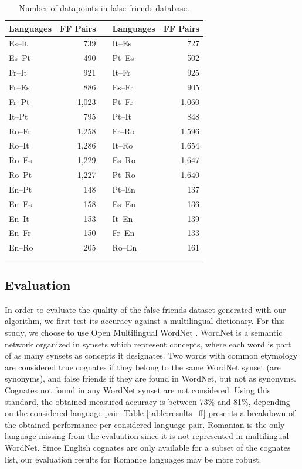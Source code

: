 \documentclass[output=paper]{langsci/langscibook}
\begin{document}
\begin{table}[!h]
    \centering
    \begin{tabular}{l r p{} l r}
         \lsptoprule
         Languages & FF Pairs & & Languages & FF Pairs \\
         \midrule
            Es--It & 739 &   & It--Es & 727 \\
            Es--Pt & 490 &   & Pt--Es & 502 \\
            Fr--It & 921 &   & It--Fr & 925 \\
            Fr--Es & 886 &   & Es--Fr & 905 \\
            Fr--Pt & 1,023 & & Pt--Fr & 1,060 \\
            It--Pt & 795 &   & Pt--It & 848 \\
            Ro--Fr & 1,258 & & Fr--Ro & 1,596 \\
            Ro--It & 1,286 & & It--Ro & 1,654 \\
            Ro--Es & 1,229 & & Es--Ro & 1,647 \\
            Ro--Pt & 1,227 & & Pt--Ro & 1,640 \\
            En--Pt & 148 &   & Pt--En & 137 \\
            En--Es & 158 &   & Es--En & 136 \\
            En--It & 153 &   & It--En & 139 \\
            En--Fr & 150 &   & Fr--En & 133 \\
            En--Ro & 205 &   & Ro--En & 161 \\
            
         \lspbottomrule
    \end{tabular}
    \caption{Number of datapoints in false friends database.}
    \label{tab:ff_db}
\end{table}


\subsection{Evaluation}

In order to evaluate the quality of the false friends dataset generated with our algorithm, we first test its accuracy against a multilingual dictionary. For this study, we choose to use Open Multilingual WordNet \citep{cognatesuban:miller1998wordnet,cognatesuban:bond2013linking}. WordNet is a semantic network organized in synsets which represent concepts, where each word is part of as many synsets as concepts it designates. Two words with common etymology are considered true cognates if they belong to the same WordNet synset (are synonyms), and false friends if they are found in WordNet, but not as synonyms. Cognates not found in any WordNet synset are not considered. Using this standard, the obtained measured accuracy is between 73\% and 81\%, depending on the considered language pair. Table \ref{table:results_ff} presents a breakdown of the obtained performance per considered language pair. Romanian is the only language missing from the evaluation since it is not represented in multilingual WordNet. Since English cognates are only available for a subset of the cognates list, our evaluation results for Romance languages may be more robust.
\end{document}
